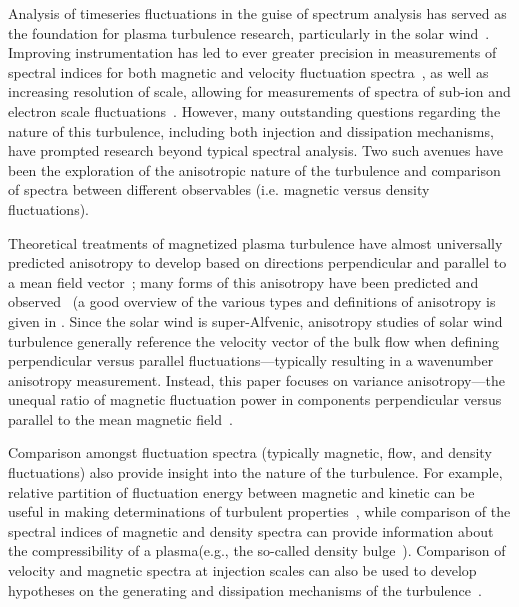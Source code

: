 \documentclass[preprint2]{aastex}
\begin{document}
Analysis of timeseries fluctuations in the guise of spectrum analysis has served as the foundation for plasma turbulence research, particularly in the solar wind~\citep{gol95,tum95}. Improving instrumentation has led to ever greater precision in measurements of spectral indices for both magnetic and velocity fluctuation spectra~\citep{pod07}, as well as increasing resolution of scale, allowing for measurements of spectra of sub-ion and electron scale fluctuations~\citep{yor08,ale09,sah09,che13}. However, many outstanding questions regarding the nature of this turbulence, including both injection and dissipation mechanisms, have prompted research beyond typical spectral analysis. Two such avenues have been the exploration of the anisotropic nature of the turbulence and comparison of spectra between different observables (i.e. magnetic versus density fluctuations).

Theoretical treatments of magnetized plasma turbulence have almost universally predicted anisotropy to develop based on directions perpendicular and parallel to a mean field vector~\citep{mon81,mat90,sri95,zho04,bol06}; many forms of this anisotropy have been predicted and observed~\citep{das05,hor08,pod09,per09,wic10,he11} (a good overview of the various types and definitions of anisotropy is given in \citet{hor12}. Since the solar wind is super-Alfvenic, anisotropy studies of solar wind turbulence generally reference the velocity vector of the bulk flow when defining perpendicular versus parallel fluctuations---typically resulting in a wavenumber anisotropy measurement. Instead, this paper focuses on variance anisotropy---the unequal ratio of magnetic fluctuation power in components perpendicular versus parallel to the mean magnetic field~\citep{bel71,smi06}.

Comparison amongst fluctuation spectra (typically magnetic, flow, and density fluctuations) also provide insight into the nature of the turbulence. For example, relative partition of fluctuation energy between magnetic and kinetic can be useful in making determinations of turbulent properties~\citep{pod07}, while comparison of the spectral indices of magnetic and density spectra can provide information about the compressibility of a plasma(e.g., the so-called density bulge~\citep{col89,har05}). Comparison of velocity and magnetic spectra at injection scales can also be used to develop hypotheses on the generating and dissipation mechanisms of the turbulence~\citep{rob10}.
\end{document}

